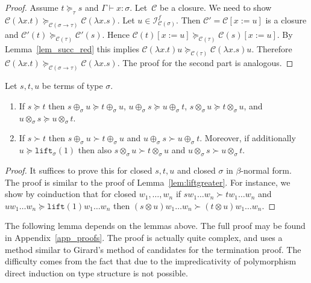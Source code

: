 \documentclass[a4paper,UKenglish,cleveref,autoref,numberwithinsect]{lipics-v2019}
\theoremstyle{definition}
\newcommand{\Iterms}{\mathcal{I}}
\newcommand{\arrtype}{\rightarrow}
\newcommand{\subst}[2]{#1:=#2}
\newcommand{\abs}[2]{\lambda #1.#2}
\newcommand{\lift}{\mathtt{lift}}
\newcommand{\cl}{\mathcal{C}}
\newcommand{\proves}{\vdash}
\begin{document}
\begin{proof}
  Assume $t \succeq_\tau s$ and $\Gamma \proves x : \sigma$. Let~$\cl$
  be a closure. We need to show $\cl(\abs{x}{t})
  \succeq_{\cl(\sigma\arrtype\tau)} \cl(\abs{x}{s})$. Let $u \in
  \Iterms^f_{\cl(\sigma)}$. Then $\cl' = \cl[\subst{x}{u}]$ is a
  closure and $\cl'(t) \succeq_{\cl(\tau)} \cl'(s)$. Hence
  $\cl(t)[\subst{x}{u}] \succeq_{\cl(\tau)} \cl(s)[\subst{x}{u}]$. By
  Lemma~\ref{lem_succ_red} this implies $\cl(\abs{x}{t}) u
  \succeq_{\cl(\tau)} \cl(\abs{x}{s}) u$. Therefore $\cl(\abs{x}{t})
  \succeq_{\cl(\sigma\arrtype\tau)} \cl(\abs{x}{s})$. The proof for
  the second part is analogous.
\end{proof}

\begin{lemma}\label{lem:plustimesmonotonic}
  Let $s,t,u$ be terms of type $\sigma$.
  \begin{enumerate}
  \item If $s \succeq t$ then $s \oplus_\sigma u \succeq t
    \oplus_\sigma u$, $u \oplus_\sigma s \succeq u \oplus_\sigma t$,
    $s \otimes_\sigma u \succeq t \otimes_\sigma u$, and $u
    \otimes_\sigma s \succeq u \otimes_\sigma t$.
  \item If $s \succ t$ then $s \oplus_\sigma u \succ t \oplus_\sigma
    u$ and $u \oplus_\sigma s \succ u \oplus_\sigma t$. Moreover, if
    additionally $u \succeq \lift_\sigma(1)$ then also $s
    \otimes_\sigma u \succ t \otimes_\sigma u$ and $u \otimes_\sigma s
    \succ u \otimes_\sigma t$.
  \end{enumerate}
\end{lemma}

\begin{proof}
  It suffices to prove this for closed $s,t,u$ and closed $\sigma$ in
  $\beta$-normal form. The proof is similar to the proof of
  Lemma~\ref{lem:liftgreater}. For instance, we show by coinduction
  that for closed $w_1,\ldots,w_n$ if $s w_1 \ldots w_n \succ t w_1
  \ldots w_n$ and $u w_1 \ldots w_n \succeq \lift(1) w_1 \ldots w_n$
  then $(s \otimes u) w_1 \ldots w_n \succ (t \otimes u) w_1 \ldots
  w_n$.
\end{proof}

The following lemma depends on the lemmas above. The full proof may be
found in Appendix~\ref{app_proofs}. The proof is actually quite
complex, and uses a method similar to Girard's method of candidates
for the termination proof. The difficulty comes from the fact that due
to the impredicativity of polymorphism direct induction on type
structure is not possible.
\end{document}
